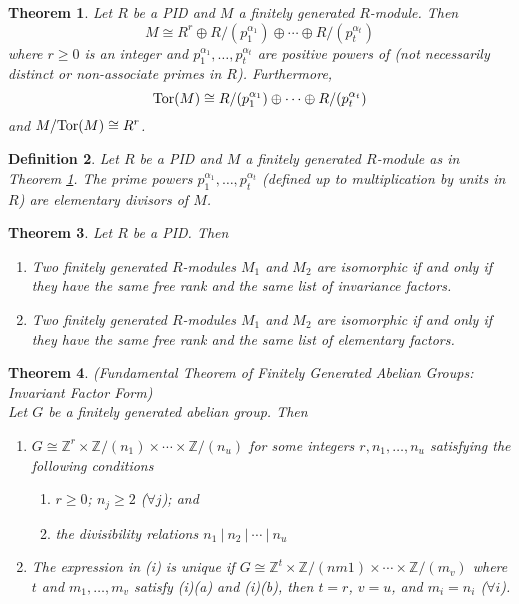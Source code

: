\documentclass[a4paper,8pt]{article}
\newcommand{\Z}{\mathbb{Z}}
\newcommand{\hlt}[1]{\textit{{\color{blue}#1}}}
\newcommand{\tors}[1]{\textnormal{Tor}#1}
\theoremstyle{theorem}
\newtheorem{theorem}{Theorem}[subsection]
\newtheorem{definition}[theorem]{Definition}
\begin{document}
\begin{theorem}
\label{thm:pidfinite}
Let $R$ be a PID and $M$ a finitely generated $R$-module. Then
\begin{equation}
M \cong R^r \oplus R/(p_1^{\alpha_1}) \oplus \cdots \oplus R/(p_t^{\alpha_t}) \nonumber
\end{equation}
where $r \geq 0$ is an integer and $ p_1^{\alpha_1}, \ldots, p_t^{\alpha_t}$ are positive powers of (not necessarily distinct or non-associate primes in $R$). Furthermore,
\begin{equation}
\tors(M) \cong R/(p_1^{\alpha_1}) \oplus \cdots \oplus R/(p_t^{\alpha_t}) \nonumber
\end{equation}
and $M/\tors(M) \cong R^r$.
\end{theorem}

\begin{definition}
Let $R$ be a PID and $M$ a finitely generated $R$-module as in Theorem \ref{thm:pidfinite}. The prime powers $p_1^{\alpha_1}, \ldots, p_t^{\alpha_t}$ (defined up to multiplication by units in $R$) are \hlt{elementary divisors of $M$}.
\end{definition}

\begin{theorem}
Let $R$ be a PID. Then
\begin{enumerate}[label=(\roman*)]
\item Two finitely generated $R$-modules $M_1$ and $M_2$ are isomorphic if and only if they have the same free rank and the same list of invariance factors.
\item Two finitely generated $R$-modules $M_1$ and $M_2$ are isomorphic if and only if they have the same free rank and the same list of elementary factors.
\end{enumerate}
\end{theorem}

\begin{theorem}
\label{thm:fundthmfgagiff}
\hlt{(Fundamental Theorem of Finitely Generated Abelian Groups: Invariant Factor Form)}\\
Let $G$ be a finitely generated abelian group. Then
\begin{enumerate}[label=(\roman*)]
\item $G \cong \Z^r \times \Z/(n_1) \times \cdots \times \Z/(n_u)$ for some integers $r, n_1, \ldots, n_u$ satisfying the following conditions
\begin{enumerate}[label=\alph*.]
\item $r \geq 0$; $n_j \geq 2$ ($\forall j$); and
\item the divisibility relations $n_1 \ | \ n_2 \ | \ \cdots \ | \ n_u$
\end{enumerate}
\item The expression in (i) is unique if $G \cong \Z^t \times \Z/(nm1) \times \cdots \times \Z/(m_v)$ where $t$ and $m_1, \ldots, m_v$ satisfy (i)(a) and (i)(b), then $t=r$, $v=u$, and $m_i = n_i$ ($\forall i$).
\end{enumerate}
\end{theorem}
\end{document}
